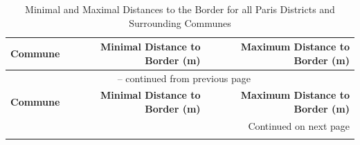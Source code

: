 \documentclass[12pt]{article}
\theoremstyle{plain}
\theoremstyle{remark}
\begin{document}
\newpage
\begin{longtable}{lrr}
\caption{Minimal and Maximal Distances to the Border for all Paris Districts and Surrounding Communes} \\
\toprule
\textbf{Commune} & \textbf{Minimal Distance to Border (m)} & \textbf{Maximum Distance to Border (m)} \\
\midrule
\endfirsthead

\multicolumn{3}{c}{{\tablename\ \thetable{} -- continued from previous page}} \\
\toprule
\textbf{Commune} & \textbf{Minimal Distance to Border (m)} & \textbf{Maximum Distance to Border (m)} \\
\midrule
\endhead

\midrule \multicolumn{3}{r}{{Continued on next page}} \\
\endfoot

\bottomrule
\endlastfoot


\end{longtable}
\end{document}
